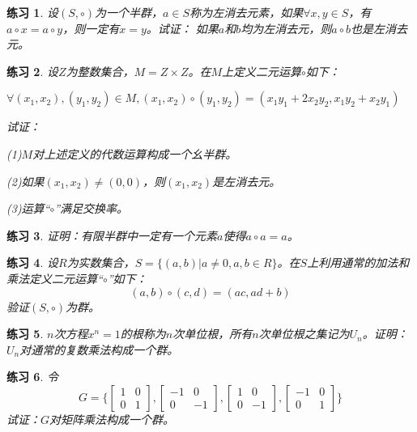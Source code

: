 \documentclass{article}
\newtheorem{Exercise}{练习}
\begin{document}
\begin{CJK*}{UTF8}{gbsn}
\begin{Exercise}
  设$(S,\circ)$为一个半群，$a\in S$称为左消去元素，如果$\forall x, y\in S$，有$a\circ x=a\circ y$，则一定有$x=y$。试证：
  如果$a$和$b$均为左消去元，则$a\circ b$也是左消去元。
\end{Exercise}

\begin{Exercise}
  设$Z$为整数集合，$M=Z\times Z$。在$M$上定义二元运算$\circ$如下：

  $\forall (x_1,x_2), (y_1,y_2)\in M, (x_1,x_2)\circ (y_1,y_2)=(x_1y_1+2x_2y_2,x_1y_2+x_2y_1)$

  试证：

  (1)$M$对上述定义的代数运算构成一个幺半群。

  (2)如果$(x_1,x_2)\neq (0,0)$，则$(x_1,x_2)$是左消去元。

  (3)运算“$\circ$”满足交换率。
\end{Exercise}


\begin{Exercise}
  证明：有限半群中一定有一个元素$a$使得$a\circ a=a$。
\end{Exercise}


\begin{Exercise}
  设$R$为实数集合，$S=\{(a,b)|a\neq 0,a,b\in R\}$。在$S$上利用通常的加法和乘法定义二元运算“$\circ$”如下：
  \[(a,b)\circ (c,d) = (ac, ad + b)\]
  验证$(S,\circ)$为群。
\end{Exercise}

\begin{Exercise}
  $n$次方程$x^n=1$的根称为$n$次单位根，所有$n$次单位根之集记为$U_n$。证明：$U_n$对通常的复数乘法构成一个群。
\end{Exercise}


\begin{Exercise}
 令
 \[G=\bigg\{\begin{bmatrix}
  1&0\\0&1
 \end{bmatrix},
 \begin{bmatrix}
  -1&0\\0&-1
 \end{bmatrix},
 \begin{bmatrix}
  1&0\\0&-1
 \end{bmatrix},
 \begin{bmatrix}
  -1&0\\0&1
 \end{bmatrix}\bigg\}\] 
 试证：$G$对矩阵乘法构成一个群。
\end{Exercise}




\end{CJK*}
\end{document}
